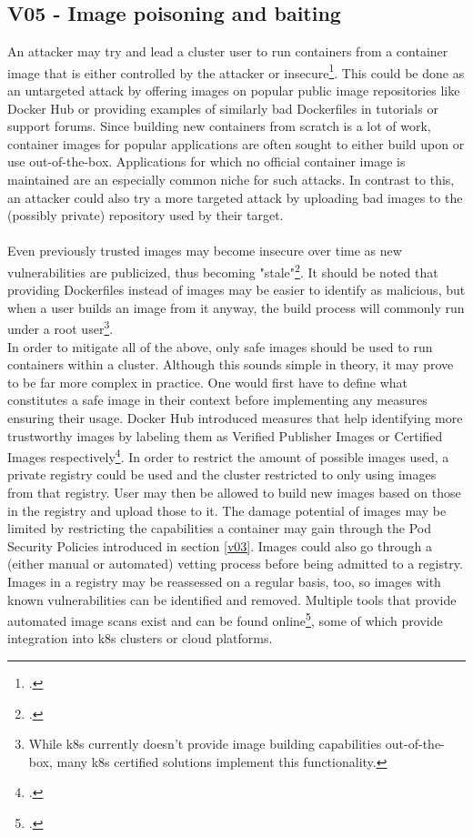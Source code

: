\subsection{V05 - Image poisoning and baiting} \label{v05}
An attacker may try and lead a cluster user to run containers from a container image that is either controlled by the attacker or insecure\footcite[][, p. 13 to 14]{nistK8s}.
This could be done as an untargeted attack by offering images on popular public image repositories like Docker Hub or providing examples of similarly bad Dockerfiles in tutorials or support forums.
Since building new containers from scratch is a lot of work, container images for popular applications are often sought to either build upon or use out-of-the-box.
Applications for which no official container image is maintained are an especially common niche for such attacks.
In contrast to this, an attacker could also try a more targeted attack by uploading bad images to the (possibly private) repository used by their target. \\
\\
Even previously trusted images may become insecure over time as new vulnerabilities are publicized, thus becoming "stale"\footcite[][, p. 14]{nistK8s}.
It should be noted that providing Dockerfiles instead of images may be easier to identify as malicious, but when a user builds an image from it anyway, the build process will commonly run under a root user\footnote{While \gls{k8s} currently doesn't provide image building capabilities out-of-the-box, many \gls{k8s} certified solutions implement this functionality.}. \\
In order to mitigate all of the above, only safe images should be used to run containers within a cluster. Although this sounds simple in theory, it may prove to be far more complex in practice. One would first have to define what constitutes a safe image in their context before implementing any measures ensuring their usage.
Docker Hub introduced measures that help identifying more trustworthy images by labeling them as Verified Publisher Images or Certified Images respectively\footcite[][, sections 'Verified Publisher Images and Plugins' and 'Certified Images and Plugins']{safeImagesDockerhub}.
In order to restrict the amount of possible images used, a private registry could be used and the cluster restricted to only using images from that registry. User may then be allowed to build new images based on those in the registry and upload those to it. 
The damage potential of images may be limited by restricting the capabilities a container may gain through the Pod Security Policies introduced in section \ref{v03}.
Images could also go through a (either manual or automated) vetting process before being admitted to a registry. Images in a registry may be reassessed on a regular basis, too, so images with known vulnerabilities can be identified and removed. Multiple tools that provide automated image scans exist and can be found online\footcite[][, section 'Securing your container images']{k8sBookWebsite}, some of which provide integration into \gls{k8s} clusters or cloud platforms.

